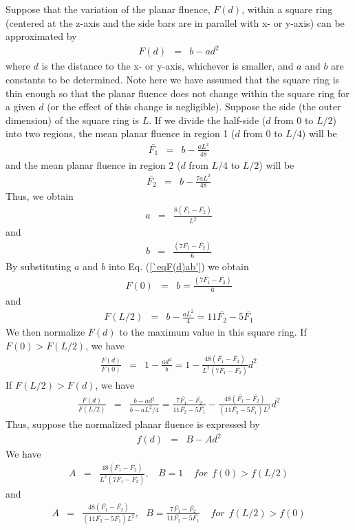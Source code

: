 \documentclass[12pt,twoside]{article}
\begin{document}
Suppose that the variation of the planar fluence, $F(d)$, within a square ring (centered at the z-axis and the side bars are in parallel with x- or y-axis) can be approximated by
\begin{eqnarray}
F(d) & =& b - ad^2 \label{`eqF(d)ab'}
\end{eqnarray}
where $d$ is the distance to the x- or y-axis, whichever is smaller, and $a$ and $b$ are constants to be determined. Note here we have assumed that the square ring is thin enough so that the planar fluence does not change within the square ring for a given $d$ (or the effect of this change is negligible). Suppose the side (the outer dimension) of the square ring is $L$. If we divide the half-side ($d$ from 0 to $L/2$) into two regions, the mean planar fluence in region 1 ($d$ from 0 to $L/4$) will be
\begin{eqnarray}
\bar{F_1} & =& b - \frac{aL^2}{48}
\end{eqnarray}
and the mean planar fluence in region 2 ($d$ from $L/4$ to $L/2$) will be
\begin{eqnarray}
\bar{F_2} & =& b - \frac{7aL^2}{48}
\end{eqnarray}
Thus, we obtain
\begin{eqnarray}
a & =& \frac{8(\bar{F_1} -\bar{F_2})}{L^2}
\end{eqnarray}
and
\begin{eqnarray}
b & =& \frac{(7\bar{F_1} -\bar{F_2})}{6}
\end{eqnarray}
By substituting $a$ and $b$ into Eq. (\ref{`eqF(d)ab'}) we obtain
\begin{eqnarray}
F(0) & =& b = \frac{(7\bar{F_1} -\bar{F_2})}{6}
\end{eqnarray}
and
\begin{eqnarray}
F(L/2) & =& b - \frac{aL^2}{4} = 11\bar{F_2} -5\bar{F_1}
\end{eqnarray}
We then  normalize $F(d)$ to the maximum value in this square ring. If $F(0) > F(L/2)$,
we have
\begin{eqnarray}
\frac{F(d)}{F(0)} & =& 1 - \frac{ad^2}{b} =  1 - \frac{48(\bar{F_1} -\bar{F_2})}{L^2(7\bar{F_1} -\bar{F_2})} d^2
\end{eqnarray}
If $F(L/2) > F(d)$,
we have
\begin{eqnarray}
\frac{F(d)}{F(L/2)} & =& \frac{b - ad^2}{b - aL^2/4} =  \frac{7\bar{F_1} -\bar{F_2}}{11\bar{F_2} - 5\bar{F_1}} - \frac{48(\bar{F_1} - \bar{F_2})}{(11\bar{F_2} - 5\bar{F_1})L^2}d^2
\end{eqnarray}
Thus, suppose the normalized planar fluence is expressed by
\begin{eqnarray}
f(d) & =& B - Ad^2 \label{`eqF(d)AB'}
\end{eqnarray}
We have
\begin{eqnarray}
A & =&  \frac{48(\bar{F_1} -\bar{F_2})}{L^2(7\bar{F_1} -\bar{F_2})},~~~~B = 1~~~~~ for ~~f(0) > f(L/2)
\end{eqnarray}
and
\begin{eqnarray}
A & =& \frac{48(\bar{F_1} - \bar{F_2})}{(11\bar{F_2} - 5\bar{F_1})L^2}, ~~~B = \frac{7\bar{F_1} -\bar{F_2}}{11\bar{F_2} - 5\bar{F_1}} ~~~~~ for ~~f(L/2) > f(0)
\end{eqnarray}
\end{document}
